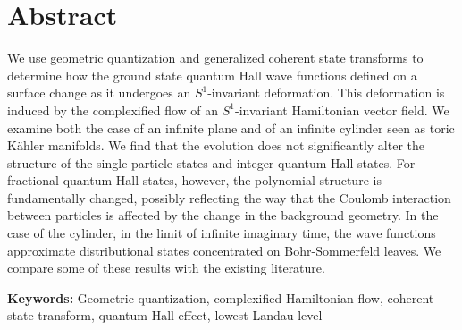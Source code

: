 \documentclass[notas.tex]{subfiles}
\begin{document}
\section*{Abstract}
We use geometric quantization and generalized coherent state transforms to determine how the ground state quantum Hall wave functions defined on a surface change as it undergoes an $S^1$-invariant deformation. This deformation is induced by the complexified flow of an $S^1$-invariant Hamiltonian vector field. We examine both the case of an infinite plane and of an infinite cylinder seen as toric Kähler manifolds. We find that the evolution does not significantly alter the structure of the single particle states and integer quantum Hall states. For fractional quantum Hall states, however, the polynomial structure is fundamentally changed, possibly reflecting the way that the Coulomb interaction between particles is affected by the change in the background geometry. In the case of the cylinder, in the limit of infinite imaginary time, the wave functions approximate distributional states concentrated on Bohr-Sommerfeld leaves. We compare some of these results with the existing literature.

\bigskip
{\bfseries Keywords:} Geometric quantization, complexified Hamiltonian flow, coherent state transform, quantum Hall effect, lowest Landau level
\end{document}
